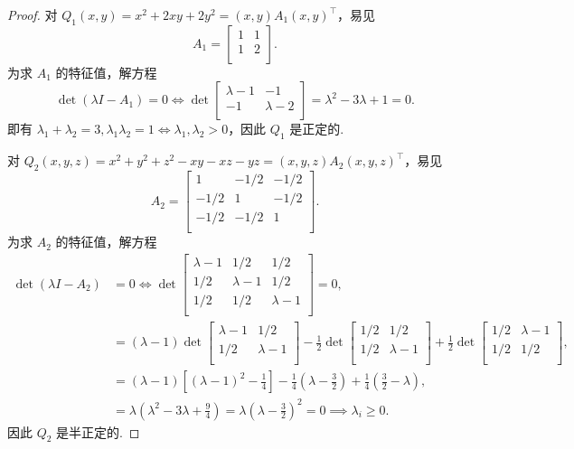 \begin{proof}
对 $Q_1 \left(x, y\right) = x^2 + 2xy + 2y^2 = \left(x, y\right) A_1 \left(x, y\right)^\top$，易见
\[
A_1 = \begin{bmatrix}
    1 & 1 \\
    1 & 2 \\
\end{bmatrix}.
\]
为求 $A_1$ 的特征值，解方程
\[
\det \left(\lambda I - A_1\right) = 0 \iff \det \begin{bmatrix}
    \lambda - 1 & -1 \\
    -1 & \lambda - 2 \\
\end{bmatrix} = \lambda^2 - 3 \lambda + 1 = 0.
\]
即有 $\lambda_1 + \lambda_2 = 3, \lambda_1 \lambda_2 = 1 \iff \lambda_1, \lambda_2 > 0$，因此 $\boxed{Q_1 \textrm{ 是正定的}}$.

对 $Q_2 \left(x, y, z\right) = x^2 + y^2 + z^2 - xy - xz - yz = \left(x, y, z\right) A_2 \left(x, y, z\right)^\top$，易见
\[
A_2 = \begin{bmatrix}
    1 & -1/2 & -1/2 \\
    -1/2 & 1 & -1/2 \\
    -1/2 & -1/2 & 1 \\
\end{bmatrix}.
\]
为求 $A_2$ 的特征值，解方程
\[
\begin{aligned}
\det \left(\lambda I - A_2\right) &= 0 \iff \det \begin{bmatrix}
    \lambda - 1 & 1/2 & 1/2 \\
    1/2 & \lambda - 1 & 1/2 \\
    1/2 & 1/2 & \lambda - 1 \\
\end{bmatrix} = 0, \\
&= \left(\lambda - 1\right) \det \begin{bmatrix}
    \lambda - 1 & 1/2 \\
    1/2 & \lambda - 1 \\
\end{bmatrix} - \frac{1}{2} \det \begin{bmatrix}
    1/2 & 1/2 \\
    1/2 & \lambda - 1 \\
\end{bmatrix} + \frac{1}{2} \det \begin{bmatrix}
    1/2 & \lambda - 1 \\
    1/2 & 1/2 \\
\end{bmatrix}, \\
&= \left(\lambda - 1\right) \left[\left(\lambda - 1\right)^2 - \frac{1}{4}\right] - \frac{1}{4} \left(\lambda - \frac{3}{2}\right) + \frac{1}{4} \left(\frac{3}{2} - \lambda\right), \\
&= \lambda \left(\lambda^2 - 3\lambda + \frac{9}{4}\right) = \lambda \left(\lambda - \frac{3}{2}\right)^2 = 0 \implies \lambda_i \ge 0.
\end{aligned}
\]
因此 $\boxed{Q_2 \textrm{ 是半正定的}}.$

\end{proof}

